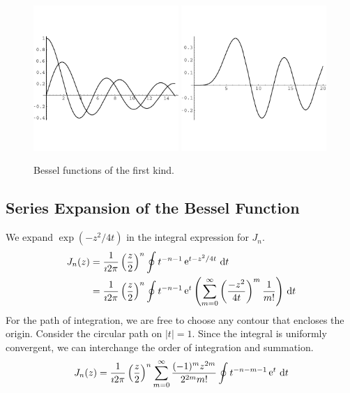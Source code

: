 \begin{figure}[h!]
  \begin{center}
    \includegraphics[width=0.49\textwidth]{ode/bessel/bessj12}
    \includegraphics[width=0.49\textwidth]{ode/bessel/besselj5}
  \end{center}
  \caption{Bessel functions of the first kind.}
  \label{besselj125}
\end{figure}









\subsection{Series Expansion of the Bessel Function}



We expand $\exp(-z^2/4t)$ in the integral expression for $J_n$.
\begin{align*}
  J_n(z)  
  &= \frac{1}{\imath 2 \pi} \left(\frac{z}{2}\right)^n \oint t^{-n-1} \mathop{\mathrm{e}}\nolimits^{t-z^2/4t}\,\mathrm{d} t 
  \\
  &= \frac{1}{\imath 2 \pi} \left(\frac{z}{2}\right)^n \oint t^{-n-1}
  \mathop{\mathrm{e}}\nolimits^t \left( \sum_{m = 0}^\infty \left(\frac{-z^2}{4 t}\right)^m
    \frac{1}{m!} \right)\,\mathrm{d} t
\end{align*}
For the path of integration, we are free to choose any contour that encloses
the origin.  Consider the circular path on $|t| = 1$.  Since the integral
is uniformly convergent, we can interchange the order of integration and 
summation.
\[ 
J_n(z) = \frac{1}{\imath 2 \pi} \left(\frac{z}{2}\right)^n \sum_{m = 0}^\infty 
\frac{(-1)^m z^{2m}}{2^{2m} m!} \oint t^{-n-m-1} \mathop{\mathrm{e}}\nolimits^t\,\mathrm{d} t 
\]

